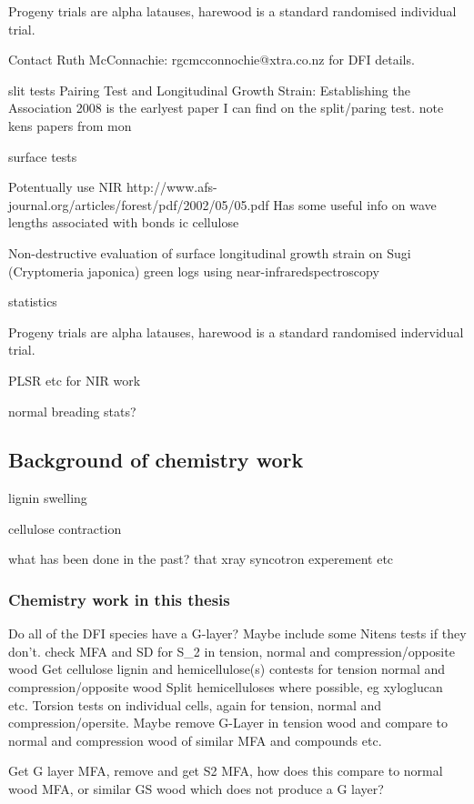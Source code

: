 \documentclass{article}
\begin{document}
Progeny trials are alpha latauses, harewood is a standard randomised individual
trial.

Contact Ruth McConnachie: rgcmcconnochie@xtra.co.nz for DFI details.

slit tests
Pairing Test and Longitudinal Growth Strain: Establishing the Association 2008
is the earlyest paper I can find on the split/paring test. note kens papers from
mon

surface tests

Potentually use NIR
http://www.afs-journal.org/articles/forest/pdf/2002/05/05.pdf
Has some useful info on wave lengths associated with bonds ic cellulose

Non-destructive evaluation of surface longitudinal growth strain
on Sugi (Cryptomeria japonica) green logs using near-infraredspectroscopy

statistics

Progeny trials are alpha latauses, harewood is a standard randomised indervidual
trial.

PLSR etc for NIR work

normal breading stats?

\subsection{Background of chemistry work}

lignin swelling

cellulose contraction

what has been done in the past?
that xray syncotron experement etc

\subsubsection{Chemistry work in this thesis}

Do all of the DFI species have a G-layer?
Maybe include some Nitens tests if they don't.
check MFA and SD for S\_2 in tension, normal and compression/opposite wood
Get cellulose lignin and hemicellulose(s) contests for tension normal and
compression/opposite wood Split hemicelluloses where possible, eg xyloglucan
etc.
Torsion tests on individual cells, again for tension, normal and
compression/opersite.
Maybe remove G-Layer in tension wood and compare to normal and compression wood of similar MFA and compounds etc.

Get G layer MFA, remove and get S2 MFA, how does this compare to normal wood
MFA, or similar GS wood which does not produce a G layer?
\end{document}
